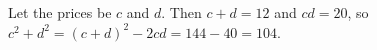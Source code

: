Let the prices be $c$ and $d$. Then $c+d=12$ and $cd=20$, so $c^2+d^2=(c+d)^2-2cd=144-40=\boxed{104}$.
